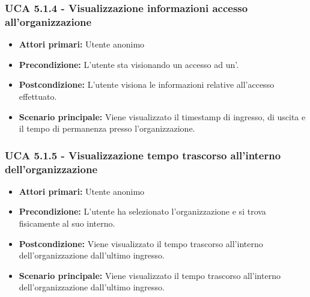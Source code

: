 \subsubsection{UCA 5.1.4 - Visualizzazione informazioni accesso all'organizzazione}
\begin{itemize}
	\item \textbf{Attori primari:} Utente anonimo
	\item \textbf{Precondizione:} L'utente sta visionando un accesso ad un'.
	\item \textbf{Postcondizione:} L'utente visiona le informazioni relative all'accesso effettuato.
	\item \textbf{Scenario principale:} Viene visualizzato il timestamp di ingresso, di uscita e il tempo di permanenza presso l'organizzazione.
\end{itemize}

\subsubsection{UCA 5.1.5 - Visualizzazione tempo trascorso all'interno dell'organizzazione}
\begin{itemize}
	\item \textbf{Attori primari:} Utente anonimo
	\item \textbf{Precondizione:} L'utente ha selezionato l'organizzazione e si trova fisicamente al suo interno.
	\item \textbf{Postcondizione:} Viene visualizzato il tempo trascorso all'interno dell'organizzazione dall'ultimo ingresso.
	\item \textbf{Scenario principale:} Viene visualizzato il tempo trascorso all'interno dell'organizzazione dall'ultimo ingresso.
\end{itemize}

